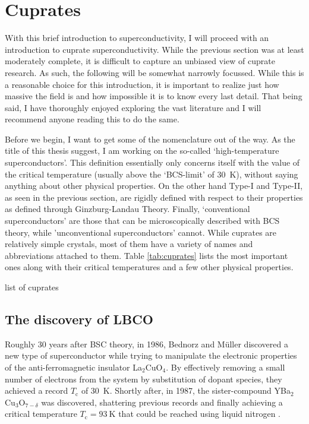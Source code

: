 \section{Cuprates}
With this brief introduction to superconductivity, I will proceed with an introduction to cuprate superconductivity. While the previous section was at least moderately complete, it is difficult to capture an unbiased view of cuprate research. As such, the following will be somewhat narrowly focussed. While this is a reasonable choice for this introduction, it is important to realize just how massive the field is and how impossible it is to know every last detail. That being said, I have thoroughly enjoyed exploring the vast literature and I will recommend anyone reading this to do the same.

Before we begin, I want to get some of the nomenclature out of the way. As the title of this thesis suggest, I am working on the so-called `high-temperature superconductors'. This definition essentially only concerns itself with the value of the critical temperature (usually above the `BCS-limit' of \SI{30}{\kelvin}), without saying anything about other physical properties. On the other hand Type-I and Type-II, as seen in the previous section, are rigidly defined with respect to their properties as defined through Ginzburg-Landau Theory. Finally, `conventional superconductors' are those that can be microscopically described with BCS theory, while 'unconventional superconductors' cannot. While cuprates are relatively simple crystals, most of them have a variety of names and abbreviations attached to them. Table \ref{tab:cuprates} lists the most important ones along with their critical temperatures and a few other physical properties.

\begin{table}
    \caption[table of cuprates]{list of cuprates}
    \label{tab:cuprates}
\end{table}

\subsection{The discovery of LBCO}
Roughly 30 years after BSC theory, in 1986, Bednorz and M\"uller discovered a new type of superconductor while trying to manipulate the electronic properties of the anti-ferromagnetic insulator La$_2$CuO$_4$. By effectively removing a small number of electrons from the system by substitution of dopant species, they achieved a record $T_\text{c}$ of \SI{30}{\kelvin}. Shortly after, in 1987, the sister-compound YBa$_2$Cu$_3$O$_{7-\delta}$ was discovered, shattering previous records and finally achieving a critical temperature $T_\text{c} = \SI{93}{\kelvin}$ that could be reached using liquid nitrogen \cite{Wu1987}.

